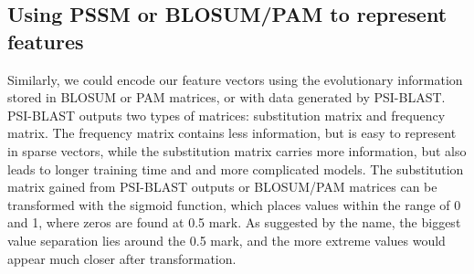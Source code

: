 \documentclass[12pt]{article}
\begin{document}
\subsection{Using PSSM or BLOSUM/PAM to represent features}

Similarly, we could encode our feature vectors using the evolutionary information stored in BLOSUM or PAM matrices, or with data generated by PSI-BLAST. 
PSI-BLAST outputs two types of matrices: substitution matrix and frequency matrix. The frequency matrix contains less information, but is easy to represent in sparse vectors, while the substitution matrix carries more information, but also leads to longer training time and and more complicated models.
The substitution matrix gained from PSI-BLAST outputs or BLOSUM/PAM matrices can be transformed with the sigmoid function\cite{3}, which places values within the range of 0 and 1, where zeros are found at 0.5 mark. As suggested by the name, the biggest value separation lies around the 0.5 mark, and the more extreme values would appear much closer after transformation. \\\\

\\
\end{document}
